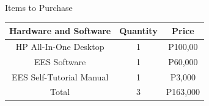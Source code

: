 \begin{frame}{Items to Purchase}
    \begin{table}[h]
        \centering
        \begin{tabular}{ccc}
        \hline
            Hardware and Software & Quantity & Price  \\
        \hline
            HP All-In-One Desktop & 1 & P100,00\\
            EES Software & 1 & P60,000 \\
            EES Self-Tutorial Manual & 1 &P3,000\\
         \hline 
            Total & 3 & P163,000 \\
         \hline
        \end{tabular}
    \end{table}
\end{frame}